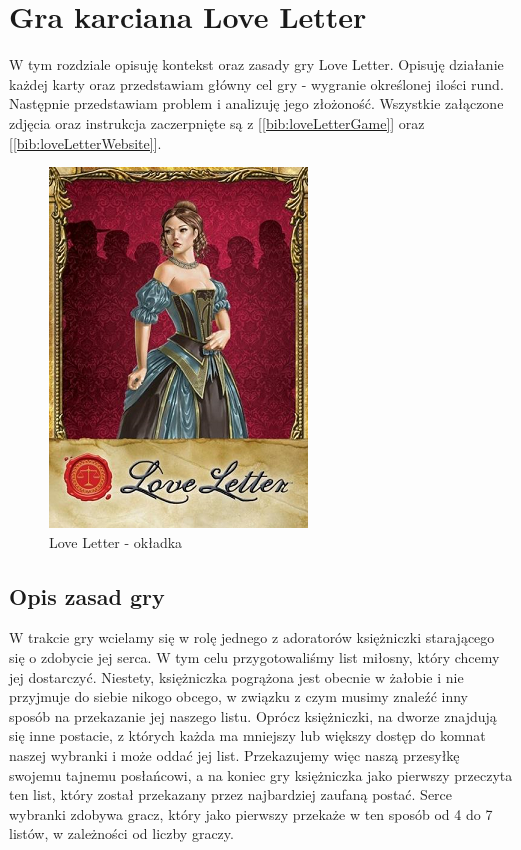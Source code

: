 \chapter{Gra karciana Love Letter}
\label{cha:rozdz2}

W tym rozdziale opisuję kontekst oraz zasady gry Love Letter. Opisuję działanie każdej karty oraz przedstawiam główny cel gry - wygranie określonej ilości rund. Następnie przedstawiam problem i analizuję jego złożoność. Wszystkie załączone zdjęcia oraz instrukcja zaczerpnięte są z [\ref{bib:loveLetterGame}] oraz [\ref{bib:loveLetterWebsite}].

\begin{figure}[h]
	\centering
	\includegraphics{Resources/ll_main_image.png}
	\caption{Love Letter - okładka} 
	\label{fig:llMainImage}
\end{figure}

\section{Opis zasad gry}
\label{sec:opisGry}
W trakcie gry wcielamy się w rolę jednego z adoratorów księżniczki starającego się o zdobycie jej serca. W tym celu przygotowaliśmy list miłosny, który chcemy jej dostarczyć. Niestety, księżniczka pogrążona jest obecnie w żałobie i nie przyjmuje do siebie nikogo obcego, w związku z czym musimy znaleźć inny sposób na przekazanie jej naszego listu. Oprócz księżniczki, na dworze znajdują się inne postacie, z których każda ma mniejszy lub większy dostęp do komnat naszej wybranki i może oddać jej list. Przekazujemy więc naszą przesyłkę swojemu tajnemu posłańcowi, a na koniec gry księżniczka jako pierwszy przeczyta ten list, który został przekazany przez najbardziej zaufaną postać. Serce wybranki zdobywa gracz, który jako pierwszy przekaże w ten sposób od 4 do 7 listów, w zależności od liczby graczy.

